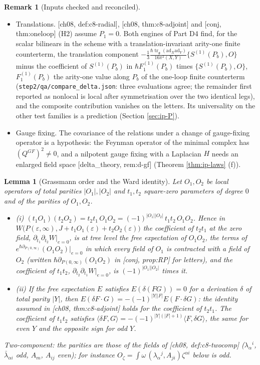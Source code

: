 \documentclass[11pt]{report}
\theoremstyle{plain}
\newtheorem{lemma}[theorem]{Lemma}
\theoremstyle{definition}
\newtheorem{remark}[theorem]{Remark}
\numberwithin{equation}{chapter}
\newcommand{\unit}{\tfrac{\hbar\operatorname{tr}_{\mathfrak g}(\mathrm{ad}_X\mathrm{ad}_Y)}{16\pi^2(X,Y)}}
\begin{document}
\begin{remark}[Inputs checked and reconciled]
\begin{itemize}
\item Translations. [ch08, def:c8-radial], [ch08, thm:c8-adjoint] and [conj, thm:oneloop] (H2) assume $P_1=0$. Both engines of Part D4 find, for the scalar bilinears in the scheme with a translation-invariant arity-one finite counterterm, the translation component $-\tfrac13\unit\{S^{(1)}(P_b),O\}$ minus the coefficient of $S^{(1)}(P_b)$ in $\hbar F_1^{(1)}(P_b)$ times $\{S^{(1)}(P_b),O\}$, $F_1^{(1)}(P_b)$ the arity-one value along $P_b$ of the one-loop finite counterterm (\texttt{step2/qa/compare\_delta.json}: three evaluations agree; the remainder first reported as nonlocal is local after symmetrisation over the two identical legs), and the composite contribution vanishes on the letters. Its universality on the other test families is a prediction (Section \ref{sec:ip-P}).
\item Gauge fixing. The covariance of the relations under a change of gauge-fixing operator is a hypothesis: the Feynman operator of the minimal complex has $(Q^{GF})^2\neq0$, and a nilpotent gauge fixing with a Laplacian $H$ needs an enlarged field space [delta\_theory, rem:d-gf] (Theorem \ref{thm:ip-laws} (f)).
\end{itemize}
\end{remark}

\begin{lemma}[Grassmann order and the Ward identity]
\label{lem:ip-ward}
Let $O_1,O_2$ be local operators of total parities $|O_1|,|O_2|$ and $t_1,t_2$ square-zero parameters of degree $0$ and of the parities of $O_1,O_2$.
\begin{itemize}
\item (i) $(t_1O_1)(t_2O_2)=t_2t_1\,O_1O_2=(-1)^{|O_1||O_2|}\,t_1t_2\,O_1O_2$. Hence in $W\big(P(\varepsilon,\infty),J+t_1O_1(\varepsilon)+t_2O_2(\varepsilon)\big)$ the coefficient of $t_2t_1$ at the zero field, $\partial_{t_1}\partial_{t_2}W|_{e=0}$, is at tree level the free expectation of $O_1O_2$, the terms of $e^{\hbar\partial_{P(0,\infty)}}(O_1O_2)|_{e=0}$ in which every field of $O_1$ is contracted with a field of $O_2$ (written $\hbar\partial_{P(0,\infty)}(O_1O_2)$ in [conj, prop:RP] for letters), and the coefficient of $t_1t_2$, $\partial_{t_2}\partial_{t_1}W|_{e=0}$, is $(-1)^{|O_1||O_2|}$ times it.
\item (ii) If the free expectation $E$ satisfies $E(\delta(FG))=0$ for a derivation $\delta$ of total parity $|Y|$, then $E(\delta F\cdot G)=-(-1)^{|Y||F|}E(F\cdot\delta G)$: the identity assumed in [ch08, thm:c8-adjoint] holds for the coefficient of $t_2t_1$. The coefficient of $t_1t_2$ satisfies $\langle\delta F,G\rangle=-(-1)^{|Y|(|F|+1)}\langle F,\delta G\rangle$, the same for even $Y$ and the opposite sign for odd $Y$.
\end{itemize}
Two-component: the parities are those of the fields of [ch08, def:c8-twocomp] ($\lambda_\alpha{}^i$, $\bar\lambda_{\dot\alpha i}$ odd, $A_m$, $A_{ij}$ even); for instance $O_\zeta=\int\omega\,(\lambda_\alpha{}^j,A_{ji})\zeta^{\alpha i}$ below is odd.
\end{lemma}
\end{document}
